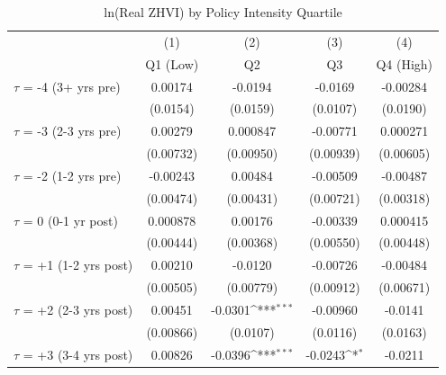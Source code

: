 \begin{table}[htbp]\centering
\def\sym#1{\ifmmode^{#1}\else\(^{#1}\)\fi}
\caption{ln(Real ZHVI) by Policy Intensity Quartile}
\label{tab:intensity_quartiles}
\begin{tabular}{l*{4}{c}}
\hline\hline
                    &\multicolumn{1}{c}{(1)}&\multicolumn{1}{c}{(2)}&\multicolumn{1}{c}{(3)}&\multicolumn{1}{c}{(4)}\\
                    &\multicolumn{1}{c}{Q1 (Low)}&\multicolumn{1}{c}{Q2}&\multicolumn{1}{c}{Q3}&\multicolumn{1}{c}{Q4 (High)}\\
\hline
$\tau$ = -4 (3+ yrs pre) &     0.00174         &     -0.0194         &     -0.0169         &    -0.00284         \\
                    &    (0.0154)         &    (0.0159)         &    (0.0107)         &    (0.0190)         \\
[0.3em]
$\tau$ = -3 (2-3 yrs pre)&     0.00279         &    0.000847         &    -0.00771         &    0.000271         \\
                    &   (0.00732)         &   (0.00950)         &   (0.00939)         &   (0.00605)         \\
[0.3em]
$\tau$ = -2 (1-2 yrs pre)&    -0.00243         &     0.00484         &    -0.00509         &    -0.00487         \\
                    &   (0.00474)         &   (0.00431)         &   (0.00721)         &   (0.00318)         \\
[0.3em]
$\tau$ = 0 (0-1 yr post) &    0.000878         &     0.00176         &    -0.00339         &    0.000415         \\
                    &   (0.00444)         &   (0.00368)         &   (0.00550)         &   (0.00448)         \\
[0.3em]
$\tau$ = +1 (1-2 yrs post)&     0.00210         &     -0.0120         &    -0.00726         &    -0.00484         \\
                    &   (0.00505)         &   (0.00779)         &   (0.00912)         &   (0.00671)         \\
[0.3em]
$\tau$ = +2 (2-3 yrs post)&     0.00451         &     -0.0301\sym{***}&    -0.00960         &     -0.0141         \\
                    &   (0.00866)         &    (0.0107)         &    (0.0116)         &    (0.0163)         \\
[0.3em]
$\tau$ = +3 (3-4 yrs post)&     0.00826         &     -0.0396\sym{***}&     -0.0243\sym{*}  &     -0.0211         \\

\end{tabular}
\end{table}
